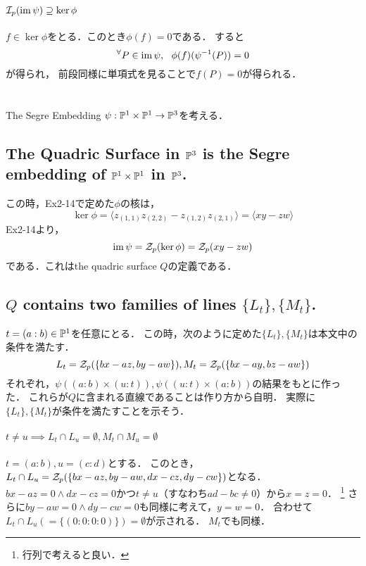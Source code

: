 \documentclass[a4paper]{jarticle}
\begin{document}
    \paragraph{$\mathcal{I}_p(\operatorname{im} \psi) \supseteq \ker \phi$}
    $f \in \ker \phi$をとる．このとき$\phi(f)=0$である．
    すると\[ {}^{\forall} P \in \operatorname{im} \psi,~~ \phi(f)(\psi^{-1}(P))=0 \]が得られ，
    前段同様に単項式を見ることで$f(P)=0$が得られる．

\section{} %
    The Segre Embedding $\psi: \mathbb{P}^1 \times \mathbb{P}^1 \to \mathbb{P}^3$を考える．

    \subsection{The Quadric Surface in $\mathbb{P}^3$ is the Segre embedding of $\mathbb{P}^1 \times \mathbb{P}^1$ in $\mathbb{P}^3$.}
    この時，Ex2-14で定めた$\phi$の核は，
    \[ \ker \phi=\langle z_{(1,1)}z_{(2,2)}-z_{(1,2)}z_{(2,1)} \rangle=\langle xy-zw \rangle \]
    Ex2-14より，
    \[ \operatorname{im} \psi=\mathcal{Z}_p(\ker \phi)=\mathcal{Z}_p(xy-zw) \]
    である．これはthe quadric surface $Q$の定義である．

    \subsection{$Q$ contains two families of lines $\{L_t\}, \{M_t\}$.}
    $t=(a:b) \in \mathbb{P}^1$を任意にとる．
    この時，次のように定めた$\{L_t\}, \{M_t\}$は本文中の条件を満たす．
    \[ L_t=\mathcal{Z}_p(\{bx-az, by-aw\}), M_t=\mathcal{Z}_p(\{bx-ay, bz-aw\})  \]
    それぞれ，$\psi((a:b) \times (u:t)), \psi((u:t) \times (a:b))$の結果をもとに作った．
    これらが$Q$に含まれる直線であることは作り方から自明．
    実際に$\{L_t\}, \{M_t\}$が条件を満たすことを示そう．

    \paragraph{$t \neq u \implies L_t \cap L_u=\emptyset, M_t \cap M_u=\emptyset$}
    $t=(a:b), u=(c:d)$とする．
    このとき，$L_t \cap L_u=\mathcal{Z}_p(\{bx-az, by-aw, dx-cz, dy-cw\})$となる．
    $bx-az=0 \land dx-cz=0$かつ$t \neq u$（すなわち$ad-bc \neq 0$）から$x=z=0$．
    \footnote{行列で考えると良い．}
    さらに$by-aw=0 \land dy-cw=0$も同様に考えて，$y=w=0$．
    合わせて$L_t \cap L_u(=\{(0:0:0:0)\})=\emptyset$が示される．
    $M_t$でも同様．
\end{document}
